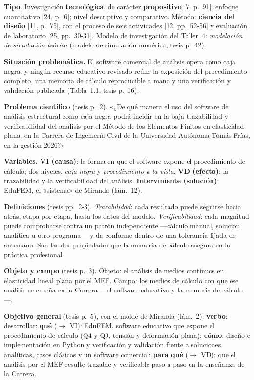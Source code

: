 \documentclass[11pt,a4paper]{article}
\newcommand{\campo}[1]{\textbf{\textcolor{tinta2}{#1}}\enspace}
\begin{document}
\begin{memorizar}
\campo{Tipo.} Investigación \textbf{tecnológica}, de carácter \textbf{propositivo} [7, p.~91]; enfoque cuantitativo [24, p.~6]; nivel descriptivo y comparativo. Método: \textbf{ciencia del diseño} [11, p.~75], con el proceso de seis actividades [12, pp.~52-56] y evaluación de laboratorio [25, pp.~30-31]. Modelo de investigación del Taller~4: \emph{modelación de simulación teórica} (modelo de simulación numérica, tesis p.~42).

\campo{Situación problemática.} El software comercial de análisis opera como caja negra, y ningún recurso educativo revisado reúne la exposición del procedimiento completo, una memoria de cálculo reproducible a mano y una verificación y validación publicada (Tabla~1.1, tesis p.~16).

\campo{Problema científico} (tesis p.~2). «¿De qué manera el uso del software de análisis estructural como caja negra podrá incidir en la baja trazabilidad y verificabilidad del análisis por el Método de los Elementos Finitos en elasticidad plana, en la Carrera de Ingeniería Civil de la Universidad Autónoma Tomás Frías, en la gestión 2026?»

\campo{Variables.} \textbf{VI (causa)}: la forma en que el software expone el procedimiento de cálculo; dos niveles, \emph{caja negra} y \emph{procedimiento a la vista}. \textbf{VD (efecto)}: la trazabilidad y la verificabilidad del análisis. \textbf{Interviniente (solución)}: EduFEM, el «sistema» de Miranda (lám.~12).

\campo{Definiciones} (tesis pp.~2-3). \emph{Trazabilidad}: cada resultado puede seguirse hacia atrás, etapa por etapa, hasta los datos del modelo. \emph{Verificabilidad}: cada magnitud puede comprobarse contra un patrón independiente ---cálculo manual, solución analítica u otro programa--- y da conforme dentro de una tolerancia fijada de antemano. Son las dos propiedades que la memoria de cálculo asegura en la práctica profesional.

\campo{Objeto y campo} (tesis p.~3). Objeto: el análisis de medios continuos en elasticidad lineal plana por el MEF. Campo: los medios de cálculo con que ese análisis se enseña en la Carrera ---el software educativo y la memoria de cálculo---.

\campo{Objetivo general} (tesis p.~5), con el molde de Miranda (lám.~2): \textbf{verbo}: desarrollar; \textbf{qué} ($\to$ VI): EduFEM, software educativo que expone el procedimiento de cálculo (Q4 y Q9, tensión y deformación plana); \textbf{cómo}: diseño e implementación en Python y verificación y validación frente a soluciones analíticas, casos clásicos y un software comercial; \textbf{para qué} ($\to$ VD): que el análisis por el MEF resulte trazable y verificable paso a paso en la enseñanza de la Carrera.


\end{memorizar}
\end{document}
